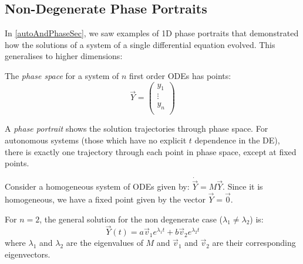\documentclass[../main.tex]{subfiles}
\begin{document}
\subsection{Non-Degenerate Phase Portraits}
\label{nonDegenPhase}
\begin{remark}[Recap]
  In \cref{autoAndPhaseSec}, we saw examples of 1D phase portraits that demonstrated how the solutions of a system of a single differential equation evolved.
  This generalises to higher dimensions:

  The \textit{phase space} for a system of $n$ first order ODEs has points:
  \[
    \vec{Y} = \begin{pmatrix}
    y_1 \\
    \vdots \\
    y_n \\
    \end{pmatrix}
  \]

  A \textit{phase portrait} shows the solution trajectories through phase space.
  For autonomous systems (those which have no explicit $t$ dependence in the DE), there is exactly one trajectory through each point in phase space, except at fixed points.
\end{remark}
Consider a homogeneous system of ODEs given by: $\dot{\vec{Y}} = M \vec{Y}$.
Since it is homogeneous, we have a fixed point given by the vector $\vec{Y} = \vec{0}$.

For $n = 2$, the general solution for the non degenerate case ($\lambda_1 \neq \lambda_2$) is:
\[
  \vec{Y}(t) = a \vec{v}_1 e^{\lambda_1 t} + b \vec{v}_2 e^{\lambda_2 t}
\]
where $\lambda_1$ and $\lambda_2$ are the eigenvalues of $M$ and $\vec{v}_1$ and $\vec{v}_2$ are their corresponding eigenvectors.
\end{document}
